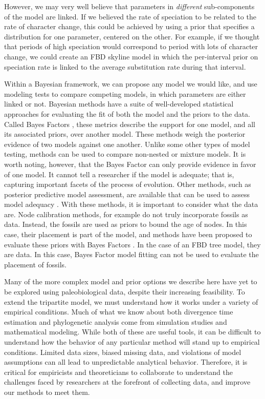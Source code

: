 However, we may very well believe that parameters in \textit{different} sub-components of the model are linked. 
If we believed the rate of speciation to be related to the rate of character change,  
this could be achieved by using a prior that specifies a distribution for one parameter, centered on the other. 
For example, if we thought that periods of high speciation would correspond to period with lots of character change, we could create an FBD skyline model in which the per-interval prior on speciation rate is linked to the average substitution rate during that interval.

Within a Bayesian framework, we can propose any model we would like, and use modeling tests to compare competing models, in which parameters are either linked or not.
Bayesian methods have a suite of well-developed statistical approaches for evaluating the fit of both the model and the priors to the data.
Called Bayes Factors \citep{Xie2011}, these metrics describe the support for one model, and all its associated priors, over another model. 
These methods weigh the posterior evidence of two models against one another. 
Unlike some other types of model testing, methods can be used to compare non-nested or mixture models.
It is worth noting, however, that the Bayes Factor can only provide evidence in favor of one model.
It cannot tell a researcher if the model is adequate; that is, capturing important facets of the process of evolution.
Other methods, such as posterior predictive model assessment, are available that can be used to assess model adequacy \citep{Brown2009, Brown2014}.
With these methods, it is important to consider what the data are.
Node calibration methods, for example do not truly incorporate fossils as data.
Instead, the fossils are used as priors to bound the age of nodes.
In this case, their placement is part of the model, and methods have been proposed to evaluate these priors with Bayes Factors \citep{Andujar2014}. %
In the case of an FBD tree model, they are data.
In this case, Bayes Factor model fitting can not be used to evaluate the placement of fossils.

Many of the more complex model and prior options we describe here have yet to be explored using paleobiological data, despite their increasing feasibility.
To extend the tripartite model, we must understand how it works under a variety of empirical conditions.
Much of what we know about both divergence time estimation and phylogenetic analysis come from simulation studies and mathematical modeling.
While both of these are useful tools, it can be difficult to understand how the behavior of any particular method will stand up to empirical conditions.
Limited data sizes, biased missing data, and violations of model assumptions can all lead to unpredictable analytical behavior.
Therefore, it is critical for %
empiricists and theoreticians to collaborate to understand the challenges faced by researchers at the forefront of collecting data, and improve our methods to meet them.

